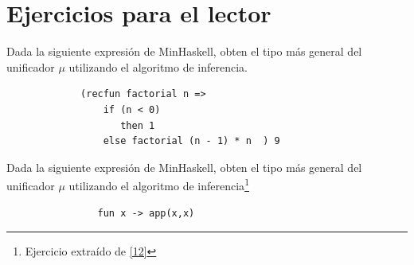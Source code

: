     \section{Ejercicios para el lector}

     \begin{exercise} Dada la siguiente expresión de MinHaskell, obten el tipo más general del unificador $\mu$ utilizando el algoritmo de inferencia.
          \begin{lstlisting}
             (recfun factorial n => 
                 if (n < 0) 
                    then 1
                 else factorial (n - 1) * n  ) 9
           \end{lstlisting}
     \end{exercise}


    \begin{exercise} Dada la siguiente expresión de MinHaskell, obten el tipo más general del unificador $\mu$ utilizando el algoritmo de inferencia\footnote{Ejercicio extraído de \hyperlink{12}{[12]}}
           \begin{lstlisting}
                fun x -> app(x,x)
           \end{lstlisting} 
    \end{exercise}
